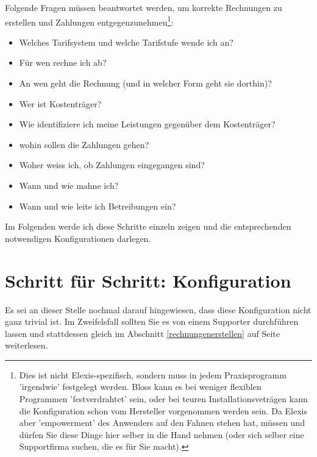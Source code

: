 \documentclass[a4paper]{scrartcl}
\begin{document}
Folgende Fragen müssen beantwortet werden, um korrekte Rechnungen zu erstellen und Zahlungen entgegenzunehmen\footnote{Dies ist nicht Elexis-spezifisch, sondern muss in jedem Praxisprogramm 'irgendwie' festgelegt werden. Bloss kann es bei weniger flexiblen Programmen 'festverdrahtet' sein, oder bei teuren Installationsveträgen kann die Konfiguration schon vom Hersteller vorgenommen werden sein. Da Elexis aber 'empowerment' des Anwenders auf den Fahnen stehen hat, müssen und dürfen Sie diese Dinge hier selber in die Hand nehmen (oder sich selber eine Supportfirma suchen, die es für Sie macht).}:

\begin{itemize}
\item Welches Tarifsystem und welche Tarifstufe wende ich an?
\item Für wen rechne ich ab?
\item An wen geht die Rechnung (und in welcher Form geht sie dorthin)?
\item Wer ist Kostenträger?
\item Wie identifiziere ich meine Leistungen gegenüber dem Kostenträger?
\item wohin sollen die Zahlungen gehen?
\item Woher weiss ich, ob Zahlungen eingegangen sind?
\item Wann und wie mahne ich?
\item Wann und wie leite ich Betreibungen ein?
\end{itemize}

Im Folgenden werde ich diese Schritte einzeln zeigen und die entsprechenden notwendigen Konfigurationen darlegen.

\section{Schritt für Schritt: Konfiguration}
Es sei an dieser Stelle nochmal darauf hingewiesen, dass diese Konfiguration nicht ganz trivial ist. Im Zweifelsfall sollten Sie es von einem Supporter durchführen lassen und stattdessen gleich im Abschnitt \ref{rechnungenerstellen} auf Seite \pageref{rechnungenerstellen} weiterlesen.

\medskip
\end{document}
